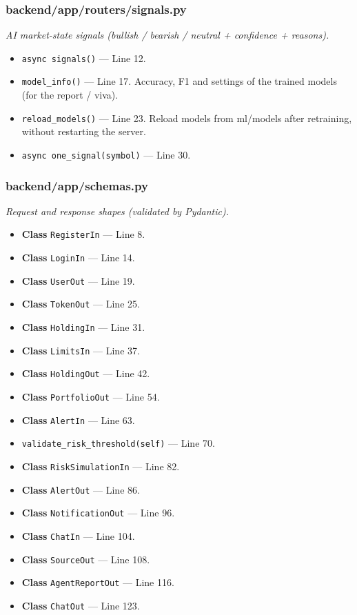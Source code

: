 \subsubsection*{backend/app/routers/signals.py}
\textit{AI market-state signals (bullish / bearish / neutral + confidence + reasons).}
\begin{itemize}[nosep,leftmargin=1.5em]
\item \texttt{async signals(\allowbreak{})} --- Line 12.
\item \texttt{model\_\allowbreak{}info(\allowbreak{})} --- Line 17. Accuracy, F1 and settings of the trained models (for the report / viva).
\item \texttt{reload\_\allowbreak{}models(\allowbreak{})} --- Line 23. Reload models from ml/models after retraining, without restarting the server.
\item \texttt{async one\_\allowbreak{}signal(\allowbreak{}symbol)} --- Line 30.
\end{itemize}
\subsubsection*{backend/app/schemas.py}
\textit{Request and response shapes (validated by Pydantic).}
\begin{itemize}[nosep,leftmargin=1.5em]
\item \textbf{Class} \texttt{RegisterIn} --- Line 8.
\item \textbf{Class} \texttt{LoginIn} --- Line 14.
\item \textbf{Class} \texttt{UserOut} --- Line 19.
\item \textbf{Class} \texttt{TokenOut} --- Line 25.
\item \textbf{Class} \texttt{HoldingIn} --- Line 31.
\item \textbf{Class} \texttt{LimitsIn} --- Line 37.
\item \textbf{Class} \texttt{HoldingOut} --- Line 42.
\item \textbf{Class} \texttt{PortfolioOut} --- Line 54.
\item \textbf{Class} \texttt{AlertIn} --- Line 63.
\item \hspace*{1em}\texttt{validate\_\allowbreak{}risk\_\allowbreak{}threshold(\allowbreak{}self)} --- Line 70.
\item \textbf{Class} \texttt{RiskSimulationIn} --- Line 82.
\item \textbf{Class} \texttt{AlertOut} --- Line 86.
\item \textbf{Class} \texttt{NotificationOut} --- Line 96.
\item \textbf{Class} \texttt{ChatIn} --- Line 104.
\item \textbf{Class} \texttt{SourceOut} --- Line 108.
\item \textbf{Class} \texttt{AgentReportOut} --- Line 116.
\item \textbf{Class} \texttt{ChatOut} --- Line 123.
\end{itemize}
